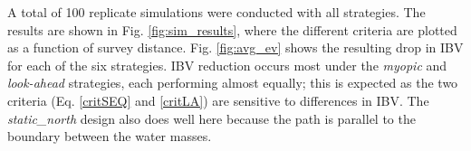 \documentclass[aoas]{imsart}
\begin{document}
A total of 100 replicate simulations were conducted with all
strategies. The results are shown in Fig. \ref{fig:sim_results}, where
the different criteria are plotted as a function of survey
distance. Fig. \ref{fig:avg_ev} shows the resulting drop in IBV for
each of the six strategies. IBV reduction occurs most under the
\textit{myopic} and \textit{look-ahead} strategies, each performing
almost equally; this is expected as the two criteria
(Eq. \eqref{critSEQ} and \eqref{critLA}) are sensitive to differences
in IBV. The \textit{static\_north} design also does well here because
the path is parallel to the boundary between the water masses.

\begin{figure}[h!]
  \centering
  \hfill
  \hfill 

\end{figure}
\end{document}
